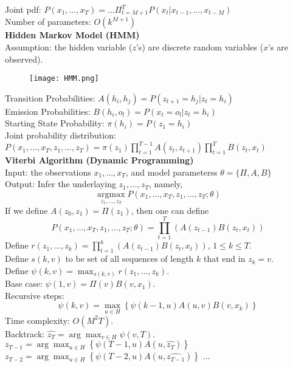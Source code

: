 \documentclass[10pt, letterpaper]{article}
\begin{document}
\begin{multicols*}{2}
Joint pdf: $P(x_1, \dots, x_T) = \dots \Pi_{t = M + 1}^T P(x_t|x_{t-1},\dots,x_{t-M})$\\
Number of parameters: $O(k^{M+1})$\\
\textbf{Hidden Markov Model (HMM)}\\
Assumption: the hidden variable ($z$'s) are discrete random variables ($x$'s are observed).
\begin{figure}[H]
    \centering
    \texttt{[image: HMM.png]}
\end{figure}
\noindent Transition Probabilities: $A\left(h_{i}, h_{j}\right)=P\left(z_{t+1}=h_{j} | z_{t}=h_{i}\right)$\\
Emission Probabilities: $B\left(h_{i}, o_{l}\right)=P\left(x_{t}=o_{l} | z_{t}=h_{i}\right)$\\
Starting State Probability: $\pi\left(h_{i}\right)=P\left(z_{1}=h_{i}\right)$\\
Joint probability distribution: $P\left(x_{1}, \ldots, x_{T}, z_{1}, \ldots, z_{T}\right)=\pi\left(z_{1}\right) \prod_{t=1}^{T-1} A\left(z_{t}, z_{t+1}\right) \prod_{t=1}^{T} B\left(z_{t}, x_{t}\right)$\\
\textbf{Viterbi Algorithm (Dynamic Programming)}\\
Input: the observations $x_1,\dots,x_T$, and model parameterss $\theta = \{\Pi, A, B\}$\\
Output: Infer the underlaying $z_1,\dots,z_T$, namely,
\[\underset{z_{1}, \ldots, z_{T}}{\operatorname{argmax}} P\left(x_{1}, \ldots, x_{T}, z_{1}, \ldots, z_{T} ; \theta\right)\]
If we define $A(z_0,z_1) = \Pi(z_1)$, then one can define
\[P\left(x_{1}, \ldots, x_{T}, z_{1}, \ldots, z_{T} ; \theta\right)=\prod_{t=1}^T \left(A(z_{t-1})B(z_t,x_t)\right)\]
Define $r(z_1,\dots, z_k) = \prod_{t=1}^k \left(A(z_{t-1})B(z_t,x_t)\right)$, $1\le k\le T$.\\
Define $s(k,v)$ to be set of all sequences
of length $k$ that end in $z_k=v$.\\
Define $\psi(k,v) = \max_{s(k,v)} r(z_1,\dots, z_k)$.\\
Base case: $\psi(1,v) = \Pi(v)B(v,x_1)$.\\
Recursive steps:
\[\psi(k,v) = \max_{u\in H} \left\{\psi(k-1,u)A(u,v)B(v,x_k)\right\}\]
Time complexity: $O(M^2T)$.\\
Backtrack: $\hat{z_T} = \arg\max_{v\in H}\psi(v,T)$.\\
$\hat{z_{T-1}} = \arg\max_{u\in H}\left\{\psi(T-1, u) A(u, \hat{z_T})\right\}$\\
$\hat{z_{T-2}} = \arg\max_{u\in H}\left\{\psi(T-2, u) A(u, \hat{z_{T-1}})\right\}$ $\dots$\\

\end{multicols*}
\end{document}
